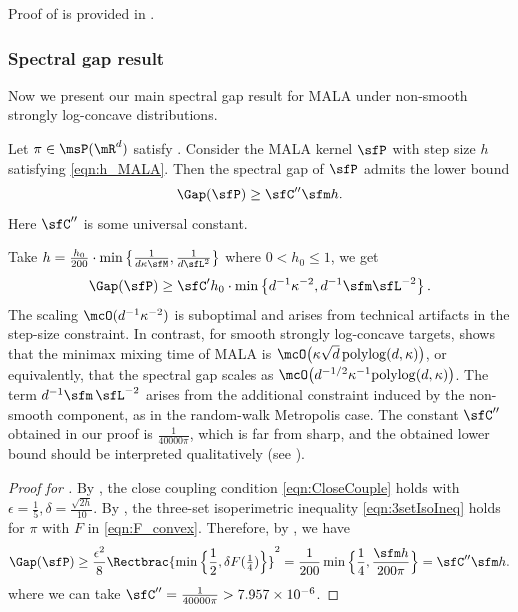 \documentclass[11pt]{article}
\begin{document}
Proof of  is provided in .



\subsubsection{Spectral gap result}
\label{sec:MALA_SpecGap}
Now we present our main spectral gap result for MALA under non-smooth strongly log-concave distributions.
%
\begin{thm}
\label{thm:SpecMALA_convex}
Let $\pi\in\msP(\mR^d)$ satisfy .
Consider the MALA kernel $\sfP$ with step size $h$ satisfying \eqref{eqn:h_MALA}.
Then the spectral gap of $\sfP$ admits the lower bound
\begin{equation}
    \Gap (\sfP) \ge \sfC'' \sfm h.
\end{equation}
Here $\sfC''$ is some universal constant.
\end{thm}

\begin{rem}
Take $h = \frac{h_0}{200} \cdot \min \left\{ \frac{1}{d \kappa \sfM} , \frac{1}{d \sfL^2} \right\} $ where $0<h_0\leq 1$, we get
\[
    \Gap(\sfP) \geq \sfC'h_0 \cdot \min \left\{ d^{-1} \kappa^{-2}, d^{-1} \sfm \sfL^{-2} \right\}.
\]
The scaling \(\mcO(d^{-1}\kappa^{-2})\) is suboptimal and arises from technical artifacts in the step-size constraint.
In contrast, for smooth strongly log-concave targets, \cite{JMLR:v23:21-1184} shows that the minimax mixing time of MALA is
\(\mcO\bigl(\kappa\sqrt{d}\,\mathrm{polylog}(d,\kappa)\bigr)\),
or equivalently, that the spectral gap scales as
\(\mcO\bigl(d^{-1/2}\kappa^{-1}\mathrm{polylog}(d,\kappa)\bigr)\).
%
The term \(d^{-1}\sfm\,\sfL^{-2}\) arises from the additional constraint induced by the non-smooth component, as in the random-walk Metropolis case.
The constant $\sfC''$ obtained in our proof is $\frac{1}{40000 \pi}$, which is far from sharp, and the obtained lower bound should be interpreted qualitatively (see ).
\end{rem}


\begin{proof}[Proof for ]
By , the close coupling condition \eqref{eqn:CloseCouple} holds with 
\(
    \epsilon = \frac{1}{5}, \delta = \frac{\sqrt{2h}}{10}.
\)
By , the three-set isoperimetric inequality \eqref{eqn:3setIsoIneq} holds for $\pi$ with $F$ in \eqref{eqn:F_convex}.
Therefore, by , we have
\begin{equation}
    \Gap(\sfP) \ge \frac{\epsilon^2}{8} \Rectbrac{ \min \Big\{ \frac{1}{2} , \delta F(\tfrac{1}{4}) \Big\} }^2 = \frac{1}{200} \min \Big\{ \frac{1}{4} , \frac{ \sfm h}{200 \pi} \Big\} = \sfC'' \sfm h.
\end{equation}
where we can take \( \sfC'' = \frac{1}{40000 \pi} > 7.957 \times 10^{-6} \).
\end{proof}
\end{document}
